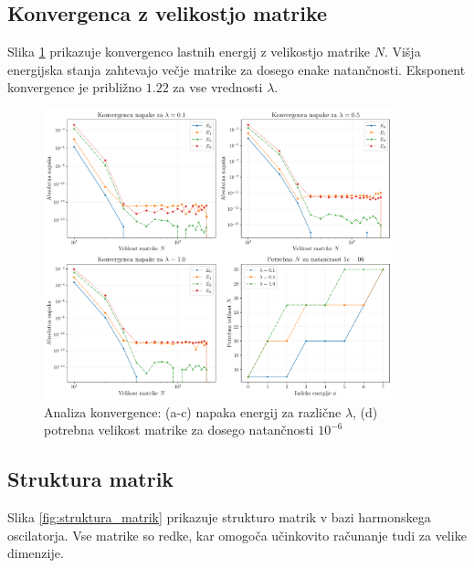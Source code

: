 \documentclass[12pt,a4paper]{article}
\begin{document}
\newpage

\subsection{Konvergenca z velikostjo matrike}

Slika \ref{fig:konvergenca} prikazuje konvergenco lastnih energij z velikostjo matrike $N$. 
Višja energijska stanja zahtevajo večje matrike za dosego enake natančnosti. 
Eksponent konvergence je približno $1.22$ za vse vrednosti $\lambda$.

\begin{figure}[hb]
    \centering
    \includegraphics[width=0.9\textwidth]{anharmonic_oscillator_plots/04_konvergenca.pdf}
    \caption{Analiza konvergence: (a-c) napaka energij za različne $\lambda$, (d) potrebna velikost matrike za dosego natančnosti $10^{-6}$}
    \label{fig:konvergenca}
\end{figure}

\newpage

\subsection{Struktura matrik}

Slika \ref{fig:struktura_matrik} prikazuje strukturo matrik v bazi harmonskega oscilatorja. 
Vse matrike so redke, kar omogoča učinkovito računanje tudi za velike dimenzije.
\end{document}
